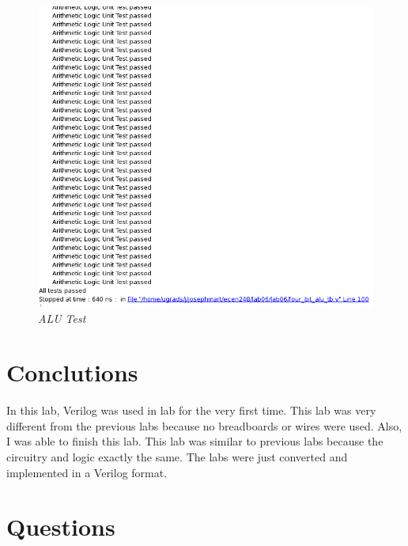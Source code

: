 \documentclass[a4paper,12pt]{article}
\begin{document}
\begin{figure}[h]
  \begin{center}
    \includegraphics[scale=0.55]{ALUTests.png}
    \caption{\textit{ALU Test}}
  \end{center}
\end{figure}

\section*{Conclutions}

\hspace{15pt}In this lab, Verilog was used in lab for the very first time. This lab was very different from the previous labs because no breadboards or wires were used. Also, I was able to finish this lab. This lab was similar to previous labs because the circuitry and logic exactly the same. The labs were just converted and implemented in a Verilog format.

\section*{Questions}
\end{document}
